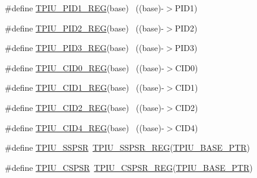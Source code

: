 \begin{DoxyCompactItemize}
\item 
\#define \hyperlink{group___t_p_i_u___register___accessor___macros_gafcbd8fadc083f6c8c9ae55edf780b9f8}{T\+P\+I\+U\+\_\+\+P\+I\+D1\+\_\+\+R\+EG}(base)                                        ~((base)-\/$>$P\+I\+D1)
\item 
\#define \hyperlink{group___t_p_i_u___register___accessor___macros_ga25559df859b61bb86a02cdc2004c6f30}{T\+P\+I\+U\+\_\+\+P\+I\+D2\+\_\+\+R\+EG}(base)                                        ~((base)-\/$>$P\+I\+D2)
\item 
\#define \hyperlink{group___t_p_i_u___register___accessor___macros_ga84d47dba808cfe2c3ce705e19b5fde1e}{T\+P\+I\+U\+\_\+\+P\+I\+D3\+\_\+\+R\+EG}(base)                                        ~((base)-\/$>$P\+I\+D3)
\item 
\#define \hyperlink{group___t_p_i_u___register___accessor___macros_gae0f119eaf4617470a270da91ce27f9fb}{T\+P\+I\+U\+\_\+\+C\+I\+D0\+\_\+\+R\+EG}(base)                                        ~((base)-\/$>$C\+I\+D0)
\item 
\#define \hyperlink{group___t_p_i_u___register___accessor___macros_ga3b9d84f25d7269b36d2c74fa5420450c}{T\+P\+I\+U\+\_\+\+C\+I\+D1\+\_\+\+R\+EG}(base)                                        ~((base)-\/$>$C\+I\+D1)
\item 
\#define \hyperlink{group___t_p_i_u___register___accessor___macros_ga5a60a1d412839185c0398f0b29153430}{T\+P\+I\+U\+\_\+\+C\+I\+D2\+\_\+\+R\+EG}(base)                                        ~((base)-\/$>$C\+I\+D2)
\item 
\#define \hyperlink{group___t_p_i_u___register___accessor___macros_ga887058c50d4ad4cfce8fefc4275e9dc2}{T\+P\+I\+U\+\_\+\+C\+I\+D4\+\_\+\+R\+EG}(base)                                        ~((base)-\/$>$C\+I\+D4)
\item 
\#define \hyperlink{group___t_p_i_u___register___accessor___macros_gafe9850f6644e019acbd41ae36f2a9bb8}{T\+P\+I\+U\+\_\+\+S\+S\+P\+SR}~\hyperlink{group___t_p_i_u___register___accessor___macros_ga70f7b58922eb91eec6196998a950e7e6}{T\+P\+I\+U\+\_\+\+S\+S\+P\+S\+R\+\_\+\+R\+EG}(\hyperlink{group___t_p_i_u___peripheral_ga9294dc3ec1881014ac83408db60de6a0}{T\+P\+I\+U\+\_\+\+B\+A\+S\+E\+\_\+\+P\+TR})
\item 
\#define \hyperlink{group___t_p_i_u___register___accessor___macros_ga30ef8dde42bb8b5ce47fd60b3450b4ce}{T\+P\+I\+U\+\_\+\+C\+S\+P\+SR}~\hyperlink{group___t_p_i_u___register___accessor___macros_gafea47d54b3ce624f0b487095a33f87ee}{T\+P\+I\+U\+\_\+\+C\+S\+P\+S\+R\+\_\+\+R\+EG}(\hyperlink{group___t_p_i_u___peripheral_ga9294dc3ec1881014ac83408db60de6a0}{T\+P\+I\+U\+\_\+\+B\+A\+S\+E\+\_\+\+P\+TR})

\end{DoxyCompactItemize}
